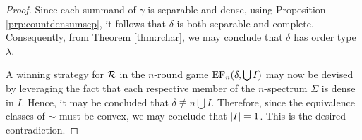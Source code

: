 \begin{proof}
	Since each summand of $\gamma$ is separable and dense, using Proposition
	\ref{prp:countdensumsep}, it follows that $\delta$ is both separable and
	complete.  Consequently, from Theorem \ref{thm:rchar}, we may conclude that
	$\delta$ has order type $\lambda$.

	A winning strategy for $\mathcal{R}$ in the $n$-round game
	$\operatorname{EF}_{n}(\delta,\bigcup I)$ may now be devised by leveraging the fact that each
	respective member of the $n$-spectrum $\Sigma$ is dense in $I$.  Hence, it
	may be concluded that $\delta\nequiv{n}\bigcup I$. Therefore, since the
	equivalence classes of $\sim$ must be convex, we may conclude that
	$\left\lvert I\right\rvert=1$.  This is the desired contradiction.
\end{proof}
